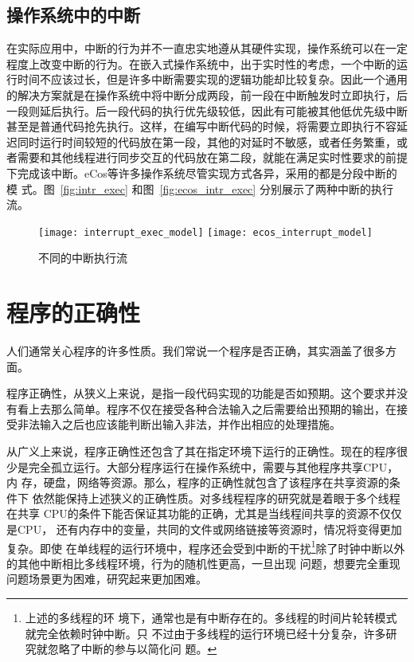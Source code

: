 \subsection{操作系统中的中断}
\label{subsec:intr_OS}
在实际应用中，中断的行为并不一直忠实地遵从其硬件实现，操作系统可以在一定
程度上改变中断的行为。在嵌入式操作系统中，出于实时性的考虑，一个中断的运
行时间不应该过长，但是许多中断需要实现的逻辑功能却比较复杂。因此一个通用
的解决方案就是在操作系统中将中断分成两段，前一段在中断触发时立即执行，后
一段则延后执行。后一段代码的执行优先级较低，因此有可能被其他低优先级中断
甚至是普通代码抢先执行。这样，在编写中断代码的时候，将需要立即执行不容延
迟同时运行时间较短的代码放在第一段，其他的对延时不敏感，或者任务繁重，或
者需要和其他线程进行同步交互的代码放在第二段，就能在满足实时性要求的前提
下完成该中断。eCos等许多操作系统尽管实现方式各异，采用的都是分段中断的模
式。\cite{ecos}图~\ref{fig:intr_exec} 和图~\ref{fig:ecos_intr_exec} 
分别展示了两种中断的执行流。

\begin{figure}[H]
	\centering
	{\texttt{[image: interrupt\_exec\_model]}}
	\hspace{4em}%
	{\texttt{[image: ecos\_interrupt\_model]}}
	\caption{不同的中断执行流}
	\label{fig:two_intr_exec}
\end{figure}

\section{程序的正确性}
\label{sec:correctness}
人们通常关心程序的许多性质。我们常说一个程序是否正确，其实涵盖了很多方面。

程序正确性，从狭义上来说，是指一段代码实现的功能是否如预期。这个要求并没
有看上去那么简单。程序不仅在接受各种合法输入之后需要给出预期的输出，在接
受非法输入之后也应该能判断出输入非法，并作出相应的处理措施。

从广义上来说，程序正确性还包含了其在指定环境下运行的正确性。现在的程序很
少是完全孤立运行。大部分程序运行在操作系统中，需要与其他程序共享CPU，内
存，硬盘，网络等资源。那么，程序的正确性就包含了该程序在共享资源的条件下
依然能保持上述狭义的正确性质。对多线程程序的研究就是着眼于多个线程在共享
CPU的条件下能否保证其功能的正确，尤其是当线程间共享的资源不仅仅是CPU，
还有内存中的变量，共同的文件或网络链接等资源时，情况将变得更加复杂。即使
在单线程的运行环境中，程序还会受到中断的干扰\footnote{上述的多线程的环
境下，通常也是有中断存在的。多线程的时间片轮转模式就完全依赖时钟中断。只
不过由于多线程的运行环境已经十分复杂，许多研究就忽略了中断的参与以简化问
题。}除了时钟中断以外的其他中断相比多线程环境，行为的随机性更高，一旦出现
问题，想要完全重现问题场景更为困难，研究起来更加困难。

